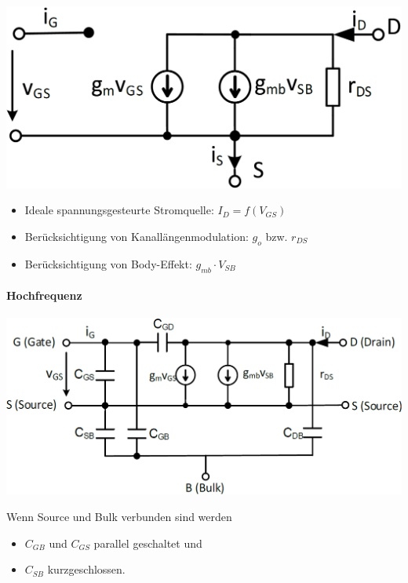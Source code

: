 \begin{minipage}[t]{0.48\columnwidth}
    \includegraphics[width=\columnwidth, align=t]{images/02_MOSFET_Pi_Ersatzschaltung_angepasste_Stromrichtung.png}
\end{minipage}
\hfill
\begin{minipage}[t]{0.48\columnwidth}
    \raggedright
    \begin{itemize}
        \item Ideale spannungsgesteurte Stromquelle: $I_D = f(V_{GS})$
        \item Berücksichtigung von Kanallängenmodulation: $g_o$ bzw. $r_{DS}$
        \item Berücksichtigung von Body-Effekt: $g_{mb} \cdot V_{SB}$
    \end{itemize}
\end{minipage}


\paragraph{Hochfrequenz}
\label{Hochfrequenz}

\begin{minipage}[t]{0.48\columnwidth}
    \includegraphics[width=\columnwidth, align=t]{images/02_MOSFET_Kleinsignalersatzschaltung_hochfrequent_angepasste_Stromrichtung.png}
\end{minipage}
\hfill
\begin{minipage}[t]{0.48\columnwidth}
    \raggedright
    Wenn Source und Bulk verbunden sind werden
    \begin{itemize}
        \item $C_{GB}$ und $C_{GS}$ parallel geschaltet und
        \item $C_{SB}$ kurzgeschlossen.
    \end{itemize}
\end{minipage}


